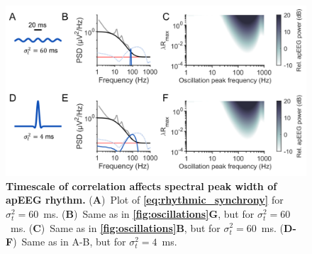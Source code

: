 \begin{figure}[h!]
    \centering
    \includegraphics[width=13.2cm]{Figures/chapter3/figureS6.png}
    \caption{\textbf{Timescale of correlation affects spectral peak width of apEEG rhythm.} (\textbf{A})~Plot of \textbf{\ref{eq:rhythmic_synchrony}} for $\sigma_t^2=60$~\unit{\milli\second}. (\textbf{B})~Same as in \textbf{\autoref{fig:oscillations}G}, but for $\sigma_t^2=60$~\unit{\milli\second}. (\textbf{C})~Same as in \textbf{\autoref{fig:oscillations}B}, but for $\sigma_t^2=60$~\unit{\milli\second}. (\textbf{D-F})~Same as in A-B, but for  $\sigma_t^2=4$~\unit{\milli\second}.}
    \label{fig:ap_rhythm_more_sig}
\end{figure}

